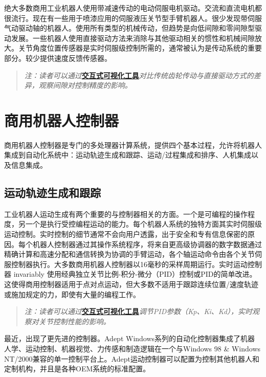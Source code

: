 \documentclass[UTF8,a4paper]{ctexart}
\begin{document}
绝大多数商用工业机器人使用带减速传动的电动伺服电机驱动。交流和直流电机都很流行。现在有一些用于喷漆应用的伺服液压关节型手臂机器人。很少发现带伺服气动驱动轴的机器人。使用所有类型的机械传动，但趋势是向低间隙和零间隙型驱动发展。一些机器人使用直接驱动方法来消除与其他驱动相关的惯性和机械间隙放大。关节角度位置传感器是实时伺服级控制所需的，通常被认为是传动系统的重要部分。较少提供速度反馈传感器。

\begin{quote}
\textit{注：读者可以通过}\href{https://frankjie09.github.io/Robot-Manipulator-Control-CN/figures/Gear_Drive_Comparison.html}{\textbf{交互式可视化工具}}\textit{对比传统齿轮传动与直接驱动方式的差异，观察间隙对控制精度的影响。}
\end{quote}

\section{商用机器人控制器}

商用机器人控制器是专门的多处理器计算系统，提供四个基本过程，允许将机器人集成到自动化系统中：运动轨迹生成和跟踪、运动/过程集成和排序、人机集成以及信息集成。

\subsection{运动轨迹生成和跟踪}

工业机器人运动生成有两个重要的与控制器相关的方面。一个是可编程的操作程度，另一个是执行受控编程运动的能力。每个机器人系统的独特方面其实时伺服级运动控制。实时控制的细节通常不会向用户透露，出于安全和专有信息保密的原因。每个机器人控制器通过其操作系统程序，将来自更高级协调器的数字数据通过精确计算和高速分配和通信转换为协调的手臂运动，各个轴运动命令由各个关节伺服控制器执行。大多数商用机器人控制器以16毫秒的采样周期运行。实时运动控制器 invariably 使用经典独立关节比例-积分-微分（PID）控制或PID的简单改进。这使得商用控制器适用于点对点运动，但大多数不适用于跟踪连续位置/速度轨迹或施加规定的力，即使有大量的编程工作。

\begin{quote}
\textit{注：读者可以通过}\href{https://frankjie09.github.io/Robot-Manipulator-Control-CN/figures/PID_Tuning_Demo.html}{\textbf{交互式可视化工具}}\textit{调节PID参数（Kp、Ki、Kd），实时观察对关节控制性能的影响。}
\end{quote}

最近，出现了更先进的控制器。Adept Windows系列的自动化控制器集成了机器人学、运动控制、机器视觉、力传感和制造逻辑在一个与Windows 98 \& Windows NT/2000兼容的单一控制平台上。Adept运动控制器可以配置为控制其他机器人和定制机构，并且是各种OEM系统的标准配置。
\end{document}
